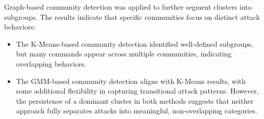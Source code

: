                 Graph-based community detection was applied to further segment clusters into subgroups. The results indicate that specific communities focus on distinct attack behaviors:

                \begin{itemize}
                    \item The K-Means-based community detection identified well-defined subgroups, but many commands appear across multiple communities, indicating overlapping behaviors.
                    \item The GMM-based community detection aligns with K-Means results, with some additional flexibility in capturing transitional attack patterns. However, the persistence of a dominant cluster in both methods suggests that neither approach fully separates attacks into meaningful, non-overlapping categories.
                \end{itemize}
                
